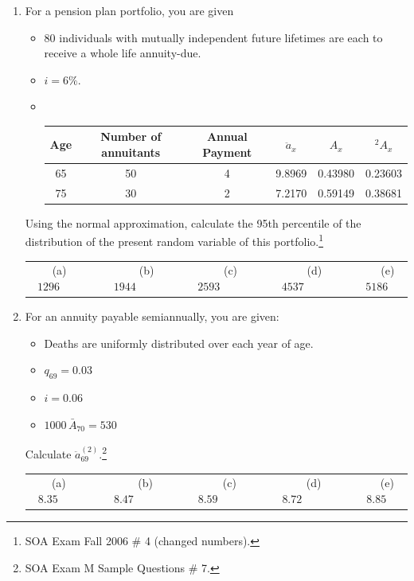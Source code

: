 \documentclass[11pt,fleqn,oneside]{book}
\begin{document}
\begin{enumerate}
\item  For a pension plan portfolio, you are given
\begin{itemize}
\item 80 individuals with mutually independent future lifetimes are each to receive a whole life annuity-due.
\item $i=6\%$.
\item $\;$

\begin{center}
\small
\begin{tabular}{| c | c | c | c | c | c|}
\hline
Age & Number of annuitants & Annual Payment & $\ddot{a}_x$ & $A_x$ & ${^2A_x}$ \\
\hline
65 & 50 & 4 & 9.8969 & 0.43980 & 0.23603 \\
75 & 30 & 2 & 7.2170 & 0.59149 & 0.38681 \\ 
\hline
\end{tabular}
\end{center}
\end{itemize}
\normalsize
Using the normal approximation, calculate the 95th percentile of the distribution of the present random variable of this portfolio.\footnote[3]{SOA Exam Fall 2006 \# 4 (changed numbers).}

\begin{center}
\small\begin{tabular}{c c c c c}
(a) $1296\;\;\;\;\;\;\;$ & 
$\;\;\;\;\;\;\;$(b) $1944\;\;\;\;\;\;\;$ &
$\;\;\;\;\;\;\;$(c) $2593\;\;\;\;\;\;\;$ & 
$\;\;\;\;\;\;\;$(d) $4537\;\;\;\;\;\;\;$ &
$\;\;\;\;\;\;\;$(e) $5186$
\end{tabular}
\end{center}
\normalsize

\item For an annuity payable semiannually, you are given:
\begin{itemize}
\item Deaths are uniformly distributed over each year of age.
\item $q_{69}=0.03$
\item $i=0.06$
\item $1000\, \bar{A}_{70}=530$
\end{itemize} 
Calculate $\ddot{a}_{69}^{(2)}$.\footnote[4]{SOA Exam M Sample Questions \# 7.}

\begin{center}
\small
\begin{tabular}{c c c c c}
(a) $8.35\;\;\;\;\;\;\;$ & 
$\;\;\;\;\;\;\;$(b) $8.47\;\;\;\;\;\;\;$ &
$\;\;\;\;\;\;\;$(c) $8.59\;\;\;\;\;\;\;$ & 
$\;\;\;\;\;\;\;$(d) $8.72\;\;\;\;\;\;\;$ &
$\;\;\;\;\;\;\;$(e) $8.85$
\end{tabular}
\end{center}



\end{enumerate}
\end{document}
